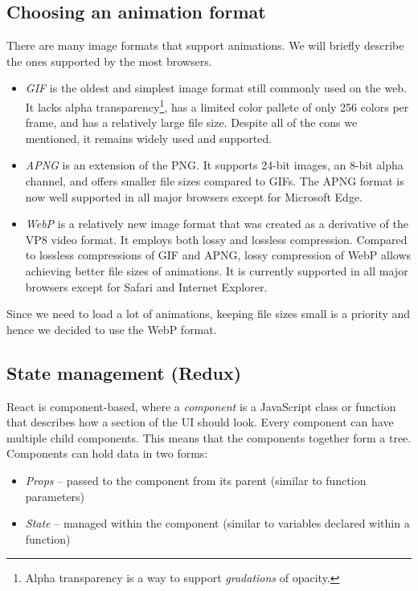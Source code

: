 \subsection{Choosing an animation format}
There are many image formats that support animations. We will briefly describe the ones supported by the most browsers.
\begin{itemize}
    \item \emph{GIF} is the oldest and simplest image format still commonly used on the web. It lacks alpha transparency\footnote{Alpha transparency is a way to
    support \emph{gradations} of opacity.}, has a limited color pallete of only 256 colors per frame, and has a relatively large file size.
    Despite all of the cons we mentioned, it remains widely used and supported.

    \item \emph{APNG} is an extension of the PNG. It supports 24-bit images, an 8-bit alpha channel, and offers smaller file sizes compared to GIFs. The APNG format
    is now well supported in all major browsers except for Microsoft Edge.

    \item \emph{WebP} is a relatively new image format that was created as a derivative of the VP8 video format. It employs both lossy and lossless compression.
    Compared to lossless compressions of GIF and APNG, lossy compression of WebP allows achieving better file sizes of animations. It is currently supported
    in all major browsers except for Safari and Internet Explorer.
\end{itemize}

Since we need to load a lot of animations, keeping file sizes small is a priority and hence we decided to use the WebP format.

\subsection{State management (Redux)}
React is component-based, where a \emph{component} is a JavaScript class or function that describes how a section of the UI should look. 
Every component can have multiple child components. This means that the components together form a tree. Components can hold data in
two forms:
\begin{itemize}
    \item \emph{Props} -- passed to the component from its parent (similar to function parameters)
    \item \emph{State} -- managed within the component (similar to variables declared within a function)
\end{itemize}

